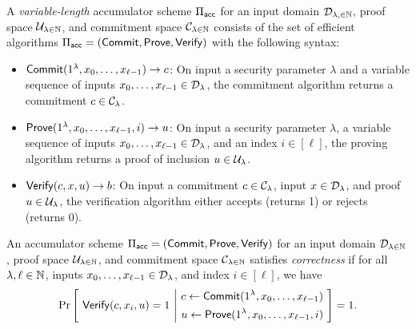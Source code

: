 \newcommand{\Piacc}{\Pi_\ms{acc}}

\begin{definition}[Accumulator]
    A \emph{variable-length} accumulator scheme $\Piacc$ for an input domain
    $\mathcal{D}_{\lambda, \in \mathbb{N}}$, proof space $\mathcal{U}_{\lambda \in \mathbb{N}}$, and commitment space
    $\mathcal{C}_{\lambda \in \mathbb{N}}$ consists of the set of efficient algorithms
    $\Piacc = (\Commit, \Prove,
    \allowbreak \Verify)$ with the following syntax:
    \begin{itemize}
        \item $\mathsf{Commit}(1^\lambda, x_0, \ldots, x_{\ell-1}) \to c$: On input a
            security parameter $\lambda$ and a variable sequence of inputs
            $x_0, \ldots, x_{\ell-1} \in \mathcal{D}_\lambda$, the commitment algorithm
            returns a commitment $c \in \mathcal{C}_\lambda$.

        \item $\mathsf{Prove}(1^\lambda, x_0, \ldots, x_{\ell-1}, i) \to u$: On input a
            security parameter $\lambda$, a variable sequence of inputs $x_0,
            \ldots, x_{\ell-1} \in \mathcal{D}_\lambda$, and an index $i \in [\ell]$, the
            proving algorithm returns a proof of inclusion $u \in \mathcal{U}_\lambda$.

        \item $\mathsf{Verify}(c, x, u) \to b$: On input a commitment $c \in
            \mathcal{C}_\lambda$, input $x \in \mathcal{D}_\lambda$, and proof $u \in
            \mathcal{U}_\lambda$, the verification algorithm either accepts (returns
            1) or rejects (returns 0).
    \end{itemize}
\end{definition}

\begin{definition}[Correctness]
    \label{def:correctness}
    An accumulator scheme $\Piacc = (\Commit, \Prove, \Verify)$ for an input
    domain $\mathcal{D}_{\lambda \in \mathbb{N}}$, proof space $\mathcal{U}_{\lambda \in \mathbb{N}}$, and
    commitment space $\mathcal{C}_{\lambda \in \mathbb{N}}$ satisfies \emph{correctness} if
    for all $\lambda, \ell \in \mathbb{N}$, inputs $x_0, \ldots, x_{\ell-1} \in
    \mathcal{D}_\lambda$, and index $i \in [\ell]$, we have
    \[ \Pr \left[~ \mathsf{Verify}(c, x_i, u) = 1 ~\Bigg|~ \begin{aligned} c \gets
        \mathsf{Commit}(1^\lambda, x_0, \ldots, x_{\ell-1}) \\ u \gets \mathsf{Prove}(1^\lambda,
        x_0, \ldots, x_{\ell-1}, i) \end{aligned} ~\right] = 1 .\]

\end{definition}


